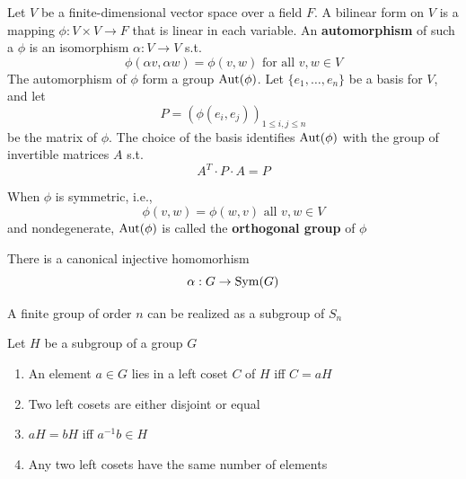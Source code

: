 \documentclass[11pt]{article}
\begin{document}
\begin{examplle}[]
Let \(V\) be a finite-dimensional vector space over a field \(F\). A bilinear form on \(V\) is a
mapping \(\phi:V\times V\to F\) that is linear in each variable. An \textbf{automorphism} of such a \(\phi\) is an
isomorphism \(\alpha:V\to V\) s.t.
\begin{equation*}
\phi(\alpha v,\alpha w)=\phi(v,w)\text{ for all }v,w\in V
\end{equation*}
The automorphism of \(\phi\) form a group \(\operatorname{\text{Aut}}(\phi)\). Let \(\{e_1,\dots,e_n\}\) be a basis for \(V\), and let
\begin{equation*}
P=(\phi(e_i,e_j))_{1\le i,j\le n}
\end{equation*}
be the matrix of \(\phi\). The choice of the basis identifies \(\operatorname{\text{Aut}}(\phi)\) with the group of invertible
matrices \(A\) s.t.
\begin{equation*}
A^T\cdot P\cdot A=P
\end{equation*}

When \(\phi\) is symmetric, i.e.,
\begin{equation*}
\phi(v,w)=\phi(w,v)\text{ all }v,w\in V
\end{equation*}
and nondegenerate, \(\operatorname{\text{Aut}}(\phi)\) is called the \textbf{orthogonal group} of \(\phi\)
\end{examplle}

\begin{theorem}[Cayley]
There is a canonical injective homomorhism
\begin{equation*}
\alpha:G\to\operatorname{Sym}(G)
\end{equation*}
\end{theorem}

\begin{corollary}[]
A finite group of order \(n\) can be realized as a subgroup of \(S_n\)
\end{corollary}

\begin{proposition}[]
Let \(H\) be a subgroup of a group \(G\)
\begin{enumerate}
\item An element \(a\in G\)  lies in a left coset \(C\) of \(H\) iff \(C=aH\)
\item Two left cosets are either disjoint or equal
\item \(aH=bH\) iff \(a^{-1}b\in H\)
\item Any two left cosets have the same number of elements
\end{enumerate}
\end{proposition}
\end{document}
